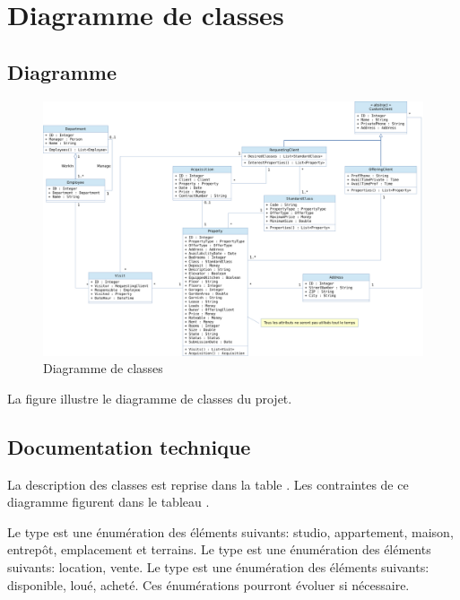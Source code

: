 \chapter{Diagramme de classes}

\section{Diagramme}

\begin{figure}
  \centering
  \includegraphics[angle=90,height=0.99\textheight]{IMG/cd}
  \caption{Diagramme de classes}
  \label{img_cd}
\end{figure}

La figure  illustre le diagramme de classes du projet.

\section{Documentation technique}

La description des classes est reprise dans la table . Les contraintes de ce diagramme figurent dans le tableau .

Le type  est une énumération des éléments suivants: studio, appartement, maison, entrepôt, emplacement et terrains. Le type  est une énumération des éléments suivants: location, vente. Le type  est une énumération des éléments suivants: disponible, loué, acheté. Ces énumérations pourront évoluer si nécessaire.

